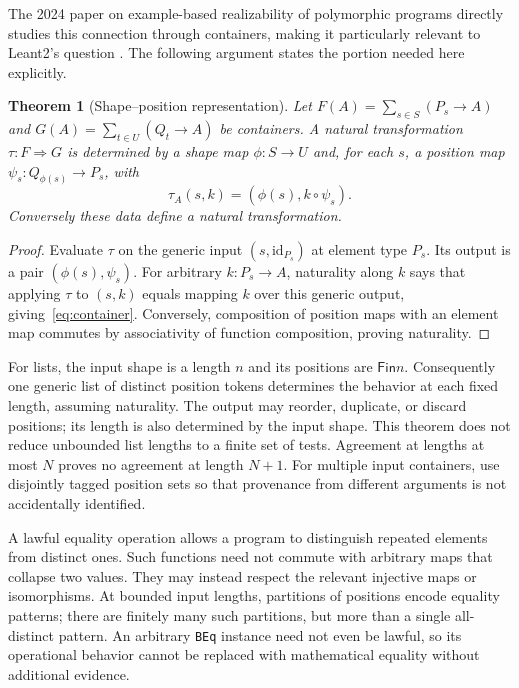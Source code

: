 \documentclass[11pt,a4paper]{article}
\newtheorem{theorem}{Theorem}[section]
\theoremstyle{definition}
\theoremstyle{remark}
\newcommand{\Fin}{\mathsf{Fin}}
\newcommand{\code}[1]{\texttt{#1}}
\begin{document}
The 2024 paper on example-based realizability of polymorphic programs directly
studies this connection through containers, making it particularly relevant
to Leant2's question \cite{containers}. The following argument states the
portion needed here explicitly.

\begin{theorem}[Shape--position representation]
Let
$F(A)=\sum_{s\in S}(P_s\to A)$ and
$G(A)=\sum_{t\in U}(Q_t\to A)$ be containers. A natural transformation
$\tau:F\Rightarrow G$ is determined by a shape map $\phi:S\to U$ and, for each
$s$, a position map $\psi_s:Q_{\phi(s)}\to P_s$, with
\[
 \tau_A(s,k)=(\phi(s),k\circ\psi_s).
 \tag{6}\label{eq:container}
\]
Conversely these data define a natural transformation.
\end{theorem}
\begin{proof}
Evaluate $\tau$ on the generic input $(s,\mathrm{id}_{P_s})$ at element type
$P_s$. Its output is a pair $(\phi(s),\psi_s)$. For arbitrary $k:P_s\to A$,
naturality along $k$ says that applying $\tau$ to $(s,k)$ equals mapping $k$
over this generic output, giving~\eqref{eq:container}. Conversely, composition
of position maps with an element map commutes by associativity of function
composition, proving naturality.
\end{proof}

For lists, the input shape is a length $n$ and its positions are $\Fin n$.
Consequently one generic list of distinct position tokens determines the
behavior at each fixed length, assuming naturality. The output may reorder,
duplicate, or discard positions; its length is also determined by the input
shape. This theorem does not reduce unbounded list lengths to a finite set of
tests. Agreement at lengths at most $N$ proves no agreement at length $N+1$.
For multiple input containers, use disjointly tagged position sets so that
provenance from different arguments is not accidentally identified.

A lawful equality operation allows a program to distinguish repeated elements
from distinct ones. Such functions need not commute with arbitrary maps that
collapse two values. They may instead respect the relevant injective maps or
isomorphisms. At bounded input lengths, partitions of positions encode equality
patterns; there are finitely many such partitions, but more than a single
all-distinct pattern. An arbitrary \code{BEq} instance need not even be lawful,
so its operational behavior cannot be replaced with mathematical equality
without additional evidence.
\end{document}
